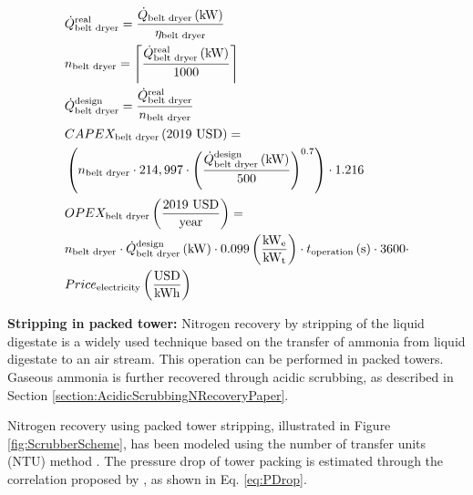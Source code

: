 \begin{refsection}[referencesCh6]
\begin{align}
& \dot{Q}_{\text{belt dryer}}^{\text{real}} = \frac{\dot{Q}_{\text{belt dryer}}\left(\text{kW}\right)}{\eta_{\text{belt dryer}}} \label{eq:QeltDryerReal} 
\\
& n_{\text{belt dryer}} = \ceil*{\frac{\dot{Q}_{\text{belt dryer}}^{\text{real}}\left(\text{kW}\right)}{1000}} \label{eq:nBeltDryer} 
\\
& \dot{Q}_{\text{belt dryer}}^{\text{design}} = \frac{\dot{Q}_{\text{belt dryer}}^{\text{real}}}{n_{\text{belt dryer}}} \label{eq:QeltDryerDesign} 
\\
& CAPEX_{\text{belt dryer}} \left(\text{2019 USD}\right) = \label{eq:CAPEXBeltDryer} \\
& \left(n_{\text{belt dryer}} \cdot 214,997 \cdot \left(\frac{\dot{Q}_{\text{belt dryer}}^{\text{design}}\left(\text{kW}\right)}{500}\right)^{0.7}\right) \cdot 1.216 \nonumber
\\
& OPEX_{\text{belt dryer}} \left(\frac{\text{2019 USD}}{\text{year}}\right) = \label{eq:BeltDryerOPEX} \\
& n_{\text{belt dryer}} \cdot \dot{Q}_{\text{belt dryer}}^{\text{design}} \left(\text{kW}\right) \cdot 0.099 \left(\frac{\text{kW}_{\text{e}}}{\text{kW}_{\text{t}}}\right) \cdot t_{\text{operation}} \left(\text{s}\right) \cdot 3600 \cdot \nonumber \\
& Price_{\text{electricity}} \left(\frac{\text{USD}}{\text{kWh}}\right)  \nonumber
\end{align}

\textbf{Stripping in packed tower:} Nitrogen recovery by stripping of the liquid digestate is a widely used technique based on the transfer of ammonia from liquid digestate to an air stream. This operation can be performed
in packed towers.
Gaseous ammonia is further recovered through acidic scrubbing, as described in Section \ref{section:AcidicScrubbingNRecoveryPaper}.

Nitrogen recovery using packed tower stripping, illustrated in Figure \ref{fig:ScrubberScheme}, has been modeled using the number of transfer units (NTU) method \citep{Metcalf}. The pressure drop of tower packing is estimated through the correlation proposed by \citet{kister1991predict}, as shown in Eq. \ref{eq:PDrop}. 


\end{refsection}
